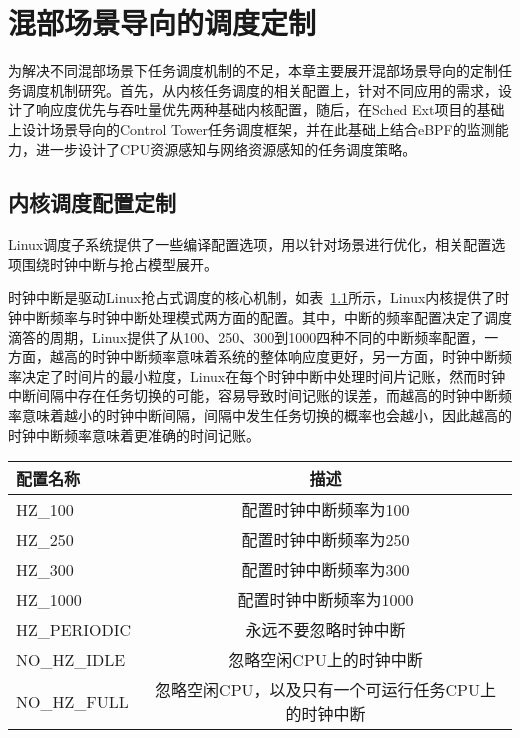 \chapter{混部场景导向的调度定制}\label{chap:sched_policy}


为解决不同混部场景下任务调度机制的不足，本章主要展开混部场景导向的定制任务调度机制研究。首先，从内核任务调度的相关配置上，针对不同应用的需求，设计了响应度优先与吞吐量优先两种基础内核配置，随后，在Sched Ext项目的基础上设计场景导向的Control Tower任务调度框架，并在此基础上结合eBPF的监测能力，进一步设计了CPU资源感知与网络资源感知的任务调度策略。

\section{内核调度配置定制}

Linux调度子系统提供了一些编译配置选项，用以针对场景进行优化，相关配置选项围绕时钟中断与抢占模型展开。

时钟中断是驱动Linux抢占式调度的核心机制，如表~\ref{tab:config_hz}所示，Linux内核提供了时钟中断频率与时钟中断处理模式两方面的配置。其中，中断的频率配置决定了调度滴答的周期，Linux提供了从100、250、300到1000四种不同的中断频率配置，一方面，越高的时钟中断频率意味着系统的整体响应度更好，另一方面，时钟中断频率决定了时间片的最小粒度，Linux在每个时钟中断中处理时间片记账，然而时钟中断间隔中存在任务切换的可能，容易导致时间记账的误差，而越高的时钟中断频率意味着越小的时钟中断间隔，间隔中发生任务切换的概率也会越小，因此越高的时钟中断频率意味着更准确的时间记账。

\begin{table}[H]
    \label{tab:config_hz}
    \footnotesize%
    \setlength{\tabcolsep}{4pt}%
    \renewcommand{\arraystretch}{1.25}%
    \centering
    \begin{tabular}{lc}
        \hline
        配置名称 & 描述 \\
        \hline
        HZ\_100  & 配置时钟中断频率为100  \\
        HZ\_250  & 配置时钟中断频率为250 \\
        HZ\_300  & 配置时钟中断频率为300 \\
        HZ\_1000 & 配置时钟中断频率为1000 \\
        HZ\_PERIODIC & 永远不要忽略时钟中断 \\
        NO\_HZ\_IDLE & 忽略空闲CPU上的时钟中断 \\
        NO\_HZ\_FULL & 忽略空闲CPU，以及只有一个可运行任务CPU上的时钟中断 \\
        \hline
    \end{tabular}
\end{table}

